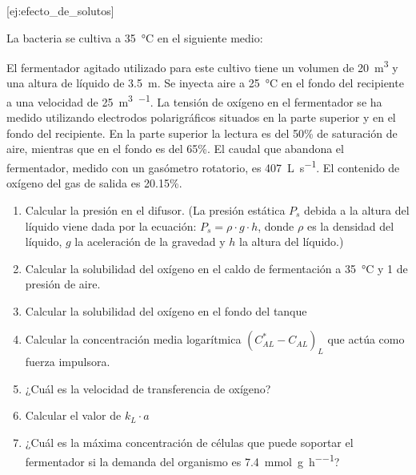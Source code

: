 \documentclass{AsignaturaResumen}
\begin{document}
[ej:efecto_de_solutos]{
    La bacteria  se cultiva a \qty{35}{\degreeCelsius} en el siguiente medio:
    \begin{table}[H]
    \end{table}
    El fermentador agitado utilizado para este cultivo tiene un volumen de \qty{20}{\m\cubed} y una altura de líquido de \qty{3.5}{\m}. Se inyecta aire a \qty{25}{\degreeCelsius} en el fondo del recipiente a una velocidad de \qty{25}{\m\cubed\per\min}. La tensión de oxígeno en el fermentador se ha medido utilizando electrodos polarigráficos situados en la parte superior y en el fondo del recipiente. En la parte superior la lectura es del 50\% de saturación de aire, mientras que en el fondo es del 65\%. El caudal que abandona el fermentador, medido con un gasómetro rotatorio, es \qty{407}{\L\per\s}. El contenido de oxígeno del gas de salida es 20.15\%.
    \begin{enumerate}
        \item Calcular la presión en el difusor. (La presión estática $P_{s}$ debida a la altura del líquido viene dada por la ecuación: $P_{s}=\rho\cdot g \cdot h$, donde $\rho$ es la densidad del líquido, $g$ la aceleración de la gravedad y $h$ la altura del líquido.)
        \item Calcular la solubilidad del oxígeno en el caldo de fermentación a \qty{35}{\degreeCelsius} y \qty{1}{\atm} de presión de aire.
        \item Calcular la solubilidad del oxígeno en el fondo del tanque
        \item Calcular la concentración media logarítmica $\left(C_{AL}^{\ast} - C_{AL}\right)_{L}$ que actúa como fuerza impulsora.
        \item ¿Cuál es la velocidad de transferencia de oxígeno?
        \item Calcular el valor de $k_{L}\cdot a$
        \item ¿Cuál es la máxima concentración de células que puede soportar el fermentador si la demanda del organismo es \qty{7.4}{\milli\mole\per\g\per\hour}?
    \end{enumerate}
}
\end{document}
